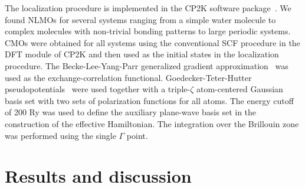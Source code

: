 \documentclass[aps,prl,reprint,amsmath,amssymb]{revtex4-1}
\begin{document}
The localization procedure is implemented in the CP2K software package~\cite{cp2kgeneral}. 
We found NLMOs for several systems ranging from a simple water molecule to complex molecules with non-trivial bonding patterns to large periodic systems. 
CMOs were obtained for all systems using the conventional SCF procedure in the DFT module of CP2K and then used as the initial states in the localization procedure. 
The Becke-Lee-Yang-Parr generalized gradient approximation~\cite{becke1988density, lee1988development} was used as the exchange-correlation functional.
Goedecker-Teter-Hutter pseudopotentials~\cite{goedecker1996separable} were used together with a triple-$\zeta$ atom-centered Gaussian basis set with two sets of polarization functions for all atoms. 
The energy cutoff of 200 Ry 
was used to define the auxiliary plane-wave basis set in the construction of the effective Hamiltonian. 
The integration over the Brillouin zone was performed using the single $\Gamma$ point.


\section{Results and discussion}


\end{document}
